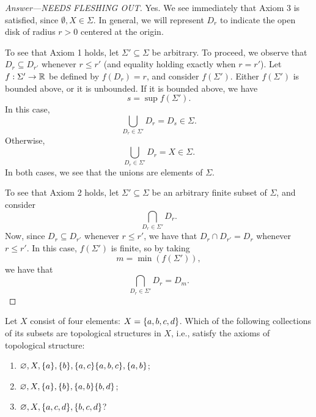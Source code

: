 \begin{proof}[Answer---NEEDS FLESHING OUT]
    Yes. We see immediately that Axiom 3 is satisfied, since $\emptyset, X \in
    \Sigma$. In general, we will represent $D_r$ to indicate the open disk of
    radius $r > 0$ centered at the origin.

    To see that Axiom 1 holds, let $\Sigma' \subseteq \Sigma$ be arbitrary. To
    proceed, we observe that $D_r \subseteq D_{r'}$ whenever $r \leq r'$ (and
    equality holding exactly when $r = r'$). Let $f : \Sigma' \to \mathbb{R}$ be
    defined by $f(D_r) = r$, and consider $f(\Sigma')$. Either $f(\Sigma')$ is
    bounded above, or it is unbounded. If it is bounded above, we have
    \[
        s = \sup f(\Sigma').
    \]
    In this case,
    \[
        \bigcup_{D_r \in \Sigma'} D_r = D_s \in \Sigma.
    \]
    Otherwise,
    \[
        \bigcup_{D_r \in \Sigma'} D_r = X \in \Sigma.
    \]
    In both cases, we see that the unions are elements of $\Sigma$.

    To see that Axiom 2 holds, let $\Sigma' \subseteq \Sigma$ be an arbitrary
    finite subset of $\Sigma$, and consider
    \[
        \bigcap_{D_r \in \Sigma'} D_r.
    \]
    Now, since $D_r \subseteq D_{r'}$ whenever $r \leq r'$, we have that $D_r
    \cap D_{r'} = D_r$ whenever $ r \leq r'$. In this case, $f(\Sigma')$ is
    finite, so by taking
    \[
        m = \min(f(\Sigma')),
    \]
    we have that
    \[
        \bigcap_{D_r \in \Sigma'} D_r = D_m.
    \]
\end{proof}

\begin{minorEx}
    Let $X$ consist of four elements: $X = \{a, b, c, d\}$. Which of the
    following collections of its subsets are topological structures in $X$,
    i.e., satisfy the axioms of topological structure:
    \begin{enumerate}
        \item $\varnothing, X, \{a\}, \{b\}, \{a,c\} \{a,b,c\},
            \{a,b\}$;
        \item $\varnothing, X, \{a\}, \{b\}, \{a,b\} \{b,d\}$;
        \item $\varnothing, X, \{a,c,d\}, \{b,c,d\}$?
    \end{enumerate}
\end{minorEx}

